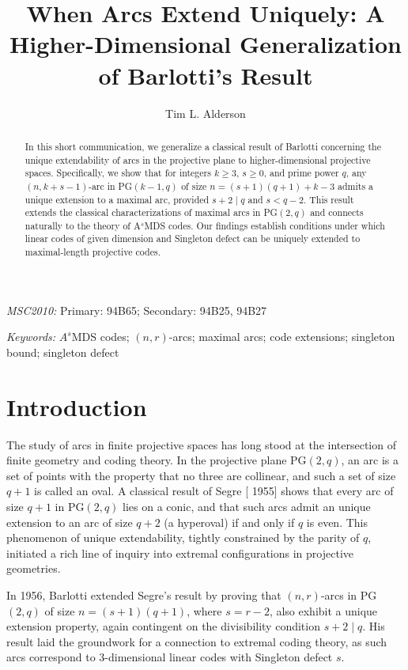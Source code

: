 \documentclass[letterpaper, 12pt]{article}
\title{When Arcs Extend Uniquely: A Higher-Dimensional Generalization of Barlotti’s Result }
\author{Tim L. Alderson}
\begin{document}
\maketitle

\begin{abstract}
	In this short communication, we generalize a classical result of Barlotti concerning the unique extendability of arcs in the projective plane to higher-dimensional projective spaces. Specifically, we show that for integers \( k \ge 3 \), \( s \ge 0 \), and prime power \( q \), any \((n, k + s - 1)\)-arc in PG\((k - 1, q)\) of size \( n = (s+1)(q+1) + k - 3 \) admits a unique extension to a maximal arc, provided \( s + 2 \mid q \) and \( s < q - 2 \). This result extends the classical characterizations of maximal arcs in PG\((2,q)\) and connects naturally to the theory of A$^s$MDS codes. Our findings establish conditions under which linear codes of given dimension and Singleton defect can be uniquely extended to maximal-length projective codes.
\end{abstract}

\textit{MSC2010:} Primary: 94B65; Secondary: 94B25, 94B27

\textit{Keywords:} $A^{s}$MDS codes; $(n,r)$-arcs; maximal arcs; code extensions; singleton bound; singleton defect


\section*{Introduction}

The study of arcs in finite projective spaces has long stood at the intersection of finite geometry and coding theory. In the projective plane PG\((2,q)\), an arc is a set of points with the property that no three are collinear, and such a set of size \( q + 1 \) is called an oval. A classical result of Segre  [\cite{MR0075608} 1955] shows that every arc of size \( q+1 \) in PG\((2,q) \) lies on a conic, and that such arcs admit an unique extension to an arc of size \( q + 2 \) (a hyperoval) if and only if \( q \) is even. This phenomenon of unique extendability, tightly constrained by the parity of \( q \), initiated a rich line of inquiry into extremal configurations in projective geometries.

In 1956, Barlotti \cite{MR0083141} extended Segre’s result by proving that \((n,r)\)-arcs in PG\((2,q)\) of size \( n = (s+1)(q+1) \), where \( s = r - 2 \), also exhibit a unique extension property, again contingent on the divisibility condition \( s+2 \mid q \). His result laid the groundwork for a connection to extremal coding theory, as such arcs correspond to $3$-dimensional linear codes with  Singleton defect $s$.
\end{document}
